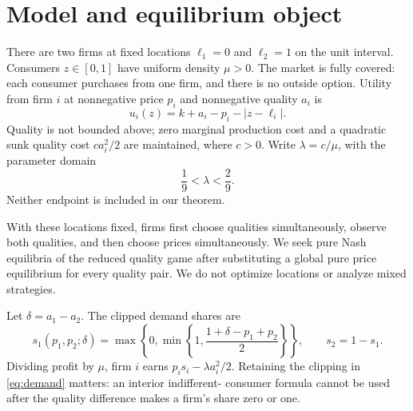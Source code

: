 \documentclass[11pt]{article}
\begin{document}
\section{Model and equilibrium object}\label{sec:model}
There are two firms at fixed locations $\ell_1=0$ and
$\ell_2=1$ on the unit interval. Consumers $z\in[0,1]$
have uniform density $\mu>0$. The market is fully
covered: each consumer purchases from one firm,
and there is no outside option. Utility from firm $i$
at nonnegative price $p_i$ and nonnegative quality
$a_i$ is
\begin{equation}\label{eq:utility}
u_i(z)=k+a_i-p_i-|z-\ell_i|.
\end{equation}
Quality is not bounded above; zero marginal production
cost and a quadratic sunk quality cost
$ca_i^2/2$ are maintained, where $c>0$.
Write $\lambda=c/\mu$, with the parameter domain
\begin{equation}\label{eq:domain}
\frac19<\lambda<\frac29.
\end{equation}
Neither endpoint is included in our theorem.

With these locations fixed, firms first choose qualities
simultaneously, observe both qualities, and then choose
prices simultaneously. We seek pure Nash equilibria of
the reduced quality game after substituting a global
pure price equilibrium for every quality pair.
We do not optimize locations or analyze mixed strategies.

Let $\delta=a_1-a_2$. The clipped demand shares are
\begin{equation}\label{eq:demand}
s_1(p_1,p_2;\delta)=
\max\left\{0,\min\left\{1,
\frac{1+\delta-p_1+p_2}{2}\right\}\right\},
\qquad s_2=1-s_1.
\end{equation}
Dividing profit by $\mu$, firm $i$ earns
$p_i s_i-\lambda a_i^2/2$. Retaining the clipping
in \eqref{eq:demand} matters: an interior indifferent-
consumer formula cannot be used after the quality
difference makes a firm's share zero or one.
\end{document}
